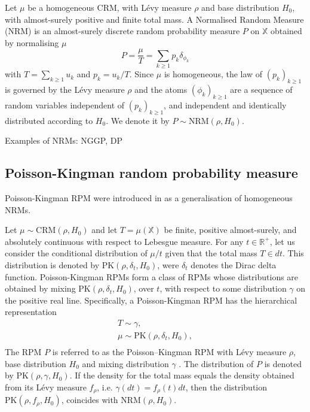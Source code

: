 \begin{definition} \label{def:NRM}
Let $\mu$ be a homogeneous \gls{CRM}, with Lévy measure $\rho$ and base distribution $H_0$, with almost-surely positive and finite total mass. A Normalised Random Measure (NRM) is an almost-surely discrete random probability measure $P$ on $\mathbb{X}$ obtained by normalising $\mu$
$$ P = \frac{\mu}{T} = \sum_{k \ge 1}{p_k \delta_{\phi_k}} $$
with $T = \sum_{k \ge 1}{u_k}$ and $p_k = u_k / T$.
Since $\mu$ is homogeneous, the law of $\left(p_k \right)_{k \ge 1}$ is governed by the Lévy measure $\rho$ and the atoms $\left(\phi_k \right)_{k \ge 1}$ are a sequence of random variables independent of $\left(p_k \right)_{k \ge 1}$, and independent and identically distributed according to $H_0$.
We denote it by $P \sim \text{NRM}(\rho, H_0)$. \\
\end{definition}


Examples of NRMs: NGGP, DP

\subsection{Poisson-Kingman random probability measure}
Poisson-Kingman \gls{RPM} were introduced in \cite{pitman2003pkp} as a generalisation of homogeneous NRMs. \\

\begin{definition} \label{def:PKRPM}
Let $\mu \sim \text{CRM}(\rho, H_0)$ and let $T = \mu(\mathbb{X})$ be finite, positive almost-surely, and absolutely continuous with respect to Lebesgue measure. For any $t \in \mathbb{R}^+$, let us consider the conditional distribution of $\mu/t$ given that the total mass $T \in dt$. This distribution is denoted by $\text{PK}(\rho, \delta_t , H_0)$, were $\delta_t$ denotes the Dirac delta function. Poisson-Kingman \gls{RPM}s form a class of \gls{RPM}s whose distributions are obtained by mixing $\text{PK}(\rho, \delta_t , H_0)$, over $t$, with respect to some distribution  $\gamma$ on the positive real line. Specifically, a Poisson-Kingman \gls{RPM} has the hierarchical representation
\begin{gather*}
T \sim \gamma, \\
\mu \sim \text{PK}(\rho, \delta_t, H_0), \\
\end{gather*}
The \gls{RPM} $P$ is referred to as the Poisson–Kingman \gls{RPM} with Lévy measure $\rho$, base distribution $H_0$ and mixing distribution $\gamma$ . The distribution of $P$ is denoted by $\text{PK}(\rho, \gamma , H_0)$. If the density for the total mass equals the density obtained from its Lévy measure $f_\rho$, i.e. $\gamma(dt) = f_\rho(t) dt$, then the distribution $\text{PK}(\rho, f_\rho , H_0)$, coincides with $\text{NRM}(\rho, H_0)$.
\end{definition}


